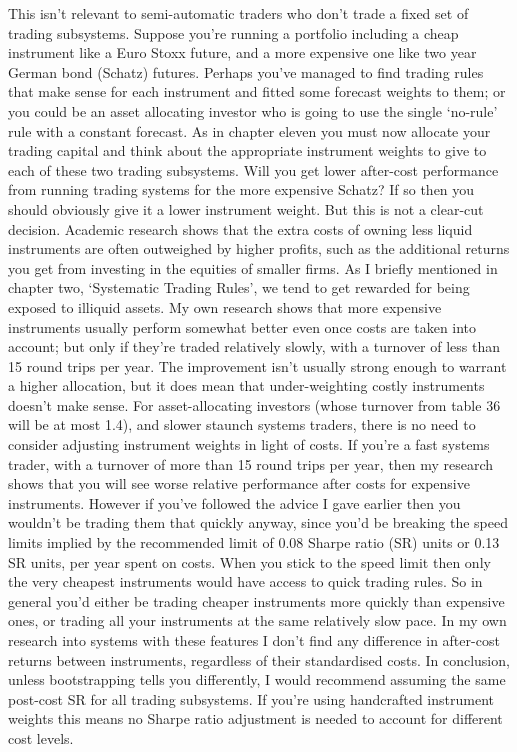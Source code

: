 

\begin{englishblock} This isn't relevant to semi-automatic traders who don't trade a fixed set of trading subsystems. Suppose you're running a portfolio including a cheap instrument like a Euro Stoxx future, and a more expensive one like two year German bond (Schatz) futures. Perhaps you've managed to find trading rules that make sense for each instrument and fitted some forecast weights to them; or you could be an asset allocating investor who is going to use the single ‘no-rule' rule with a constant forecast. As in chapter eleven you must now allocate your trading capital and think about the appropriate instrument weights to give to each of these two trading subsystems. Will you get lower after-cost performance from running trading systems for the more expensive Schatz? If so then you should obviously give it a lower instrument weight. But this is not a clear-cut decision. Academic research shows that the extra costs of owning less liquid instruments are often outweighed by higher profits, such as the additional returns you get from investing in the equities of smaller firms. As I briefly mentioned in chapter two, ‘Systematic Trading Rules', we tend to get rewarded for being exposed to illiquid assets. My own research shows that more expensive instruments usually perform somewhat better even once costs are taken into account; but only if they're traded relatively slowly, with a turnover of less than 15 round trips per year. The improvement isn't usually strong enough to warrant a higher allocation, but it does mean that under-weighting costly instruments doesn't make sense. For asset-allocating investors (whose turnover from table 36 will be at most 1.4), and slower staunch systems traders, there is no need to consider adjusting instrument weights in light of costs. If you're a fast systems trader, with a turnover of more than 15 round trips per year, then my research shows that you will see worse relative performance after costs for expensive instruments. However if you've followed the advice I gave earlier then you wouldn't be trading them that quickly anyway, since you'd be breaking the speed limits implied by the recommended limit of 0.08 Sharpe ratio (SR) units or 0.13 SR units, per year spent on costs. When you stick to the speed limit then only the very cheapest instruments would have access to quick trading rules. So in general you'd either be trading cheaper instruments more quickly than expensive ones, or trading all your instruments at the same relatively slow pace. In my own research into systems with these features I don't find any difference in after-cost returns between instruments, regardless of their standardised costs. In conclusion, unless bootstrapping tells you differently, I would recommend assuming the same post-cost SR for all trading subsystems. If you're using handcrafted instrument weights this means no Sharpe ratio adjustment is needed to account for different cost levels. \end{englishblock}

